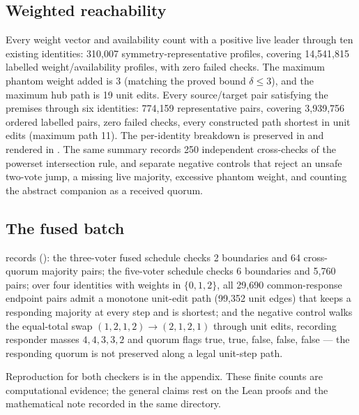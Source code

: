 \documentclass[10pt,journal,letterpaper]{IEEEtran}
\begin{document}
\subsection{Weighted reachability}
Every weight vector and availability count with a positive live leader
through ten existing identities: 310{,}007 symmetry-representative profiles,
covering 14{,}541{,}815 labelled weight/availability profiles, with zero
failed checks. The maximum phantom weight added is 3 (matching the proved
bound $\delta\leq 3$), and the maximum hub path is 19 unit edits. Every
source/target pair satisfying the premises through six identities:
774{,}159 representative pairs, covering 3{,}939{,}756 ordered labelled pairs,
zero failed checks, every constructed path shortest in unit edits (maximum
path 11). The per-identity breakdown is preserved in
 and rendered in .
The same summary records 250 independent cross-checks of the powerset
intersection rule, and separate negative controls that reject an unsafe
two-vote jump, a missing live majority, excessive phantom weight, and
counting the abstract companion as a received quorum.

\subsection{The fused batch}
 records
(): the three-voter fused schedule checks
2 boundaries and 64 cross-quorum majority pairs; the five-voter schedule
checks 6 boundaries and 5{,}760 pairs; over four identities with weights in
$\{0,1,2\}$, all 29{,}690 common-response endpoint pairs admit a
monotone unit-edit path (99{,}352 unit edges) that keeps a responding
majority at every step and is shortest; and the negative control walks the
equal-total swap $(1,2,1,2)\to(2,1,2,1)$ through unit edits, recording
responder masses $4,4,3,3,2$ and quorum flags
true, true, false, false, false --- the responding quorum is not preserved
along a legal unit-step path.

Reproduction for both checkers is in the appendix. These finite counts are
computational evidence; the general claims rest on the Lean proofs and the
mathematical note recorded in the same directory.
\end{document}
